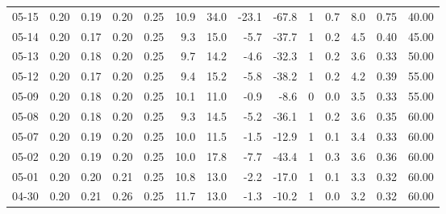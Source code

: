 \begin{threeparttable}
{\begin{tabular}{lrrrrrrrrrrrrr}
  05-15 &          0.20 &          0.19 &          0.20 &        0.25 &                10.9 &                34.0 &      -23.1 &        -67.8 &              1 &                 0.7 &              8.0 &            0.75 &                  40.00 \\
  05-14 &          0.20 &          0.17 &          0.20 &        0.25 &                 9.3 &                15.0 &       -5.7 &        -37.7 &              1 &                 0.2 &              4.5 &            0.40 &                  45.00 \\
  05-13 &          0.20 &          0.18 &          0.20 &        0.25 &                 9.7 &                14.2 &       -4.6 &        -32.3 &              1 &                 0.2 &              3.6 &            0.33 &                  50.00 \\
  05-12 &          0.20 &          0.17 &          0.20 &        0.25 &                 9.4 &                15.2 &       -5.8 &        -38.2 &              1 &                 0.2 &              4.2 &            0.39 &                  55.00 \\
  05-09 &          0.20 &          0.18 &          0.20 &        0.25 &                10.1 &                11.0 &       -0.9 &         -8.6 &              0 &                 0.0 &              3.5 &            0.33 &                  55.00 \\
  05-08 &          0.20 &          0.18 &          0.20 &        0.25 &                 9.3 &                14.5 &       -5.2 &        -36.1 &              1 &                 0.2 &              3.6 &            0.35 &                  60.00 \\
  05-07 &          0.20 &          0.19 &          0.20 &        0.25 &                10.0 &                11.5 &       -1.5 &        -12.9 &              1 &                 0.1 &              3.4 &            0.33 &                  60.00 \\
  05-02 &          0.20 &          0.19 &          0.20 &        0.25 &                10.0 &                17.8 &       -7.7 &        -43.4 &              1 &                 0.3 &              3.6 &            0.36 &                  60.00 \\
  05-01 &          0.20 &          0.20 &          0.21 &        0.25 &                10.8 &                13.0 &       -2.2 &        -17.0 &              1 &                 0.1 &              3.3 &            0.32 &                  60.00 \\
  04-30 &          0.20 &          0.21 &          0.26 &        0.25 &                11.7 &                13.0 &       -1.3 &        -10.2 &              1 &                 0.0 &              3.2 &            0.32 &                  60.00 \\

\end{tabular}}
\end{threeparttable}
